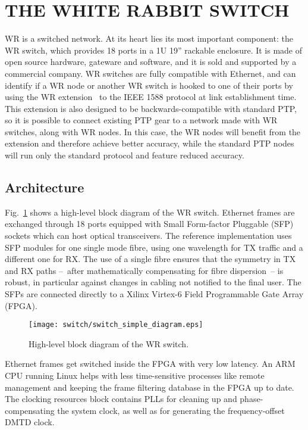 \documentclass{../JAC2003}
\begin{document}
\section{THE WHITE RABBIT SWITCH}

WR is a switched network. At its heart lies its most important
component: the WR switch, which provides 18 ports in a 1U 19''
rackable enclosure. It is made of open source hardware, gateware and
software, and it is sold and supported by a commercial company. WR
switches are fully compatible with Ethernet, and can identify if a WR
node or another WR switch is hooked to one of their ports by using the
WR extension~\cite{wr-extension-ref} to the IEEE 1588 protocol at
link establishment time. This extension is also designed to be
backwards-compatible with standard PTP, so it is possible to connect
existing PTP gear to a network made with WR switches, along with WR
nodes. In this case, the WR nodes will benefit from the extension and
therefore achieve better accuracy, while the standard PTP nodes will
run only the standard protocol and feature reduced accuracy.

\subsection{Architecture}

Fig.~\ref{switch-top-fig} shows a high-level block diagram of the WR
switch. Ethernet frames are exchanged through 18 ports equipped with
Small Form-factor Pluggable (SFP) sockets which can host optical
transceivers. The reference implementation uses SFP modules for one
single mode fibre, using one wavelength for TX traffic and a different
one for RX. The use of a single fibre ensures that the symmetry in TX
and RX paths --~after mathematically compensating for fibre
dispersion~-- is robust, in particular against changes in cabling not
notified to the final user. The SFPs are connected directly to a
Xilinx Virtex-6 Field Programmable Gate Array (FPGA).

\begin{figure}[htb]
   \centering
   \texttt{[image: switch/switch\_simple\_diagram.eps]}
   \caption{High-level block diagram of the WR switch.}
   \label{switch-top-fig}
\end{figure}

Ethernet frames get switched inside the FPGA with very low latency. An
ARM CPU running Linux helps with less time-sensitive processes like
remote management and keeping the frame filtering database in the FPGA
up to date. The clocking resources block contains PLLs for cleaning up
and phase-compensating the system clock, as well as for generating the
frequency-offset DMTD clock.
\end{document}
